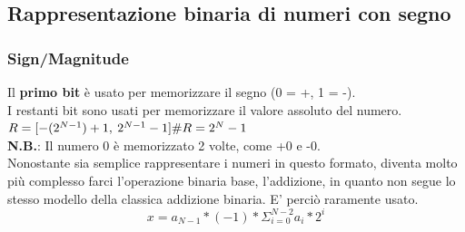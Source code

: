 \documentclass{report}
\begin{document}
    \subsection{Rappresentazione binaria di numeri con segno}
        \subsubsection{Sign/Magnitude}
            Il \textbf{primo bit} è usato per memorizzare il segno (0 = +, 1 = -). \\
            I restanti bit sono usati per memorizzare il valore assoluto del numero. \\
            $R = [-(2^{N-1}) + 1, \: 2^{N-1} - 1] \\
            \#R = 2^N - 1
            $ \\
            \textbf{N.B.}: Il numero 0 è memorizzato 2 volte, come +0 e -0. \\
            Nonostante sia semplice rappresentare i numeri in questo formato, diventa
            molto più complesso farci l'operazione binaria base, l'addizione, in quanto
            non segue lo stesso modello della classica addizione binaria. E' perciò
            raramente usato.
            $$ x = a_{N-1} * (-1) * \Sigma_{i = 0}^{N-2} a_i * 2^i $$
\end{document}
